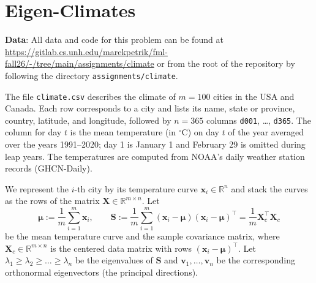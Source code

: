 \documentclass[letterpaper]{article}
\newcommand{\Real}{\mathbb{R}}
\newcommand{\tr}{^\top}
\begin{document}
\section{Eigen-Climates} \label{sec:eigen-climates}

\textbf{Data}: All data and code for this problem can be found at \url{https://gitlab.cs.unh.edu/marekpetrik/fml-fall26/-/tree/main/assignments/climate} or from the root of the repository by following the directory \texttt{assignments/climate}.

The file \texttt{climate.csv} describes the climate of $m = 100$ cities in the USA and Canada. Each row corresponds to a city and lists its name, state or province, country, latitude, and longitude, followed by $n = 365$ columns \texttt{d001}, \dots, \texttt{d365}. The column for day $t$ is the mean temperature (in $^\circ$C) on day $t$ of the year averaged over the years 1991--2020; day 1 is January 1 and February 29 is omitted during leap years. The temperatures are computed from NOAA's daily weather station records (GHCN-Daily).

We represent the $i$-th city by its temperature curve $\bm{x}_i \in \Real^n$ and stack the curves as the rows of the matrix $\bm{X} \in \Real^{m \times n}$. Let
\[
  \bm{\mu} := \frac{1}{m} \sum_{i=1}^m \bm{x}_i,
  \qquad
  \bm{S} := \frac{1}{m} \sum_{i=1}^m (\bm{x}_i - \bm{\mu})(\bm{x}_i - \bm{\mu})\tr = \frac{1}{m} \bm{X}_c\tr \bm{X}_c
\]
be the mean temperature curve and the sample covariance matrix, where $\bm{X}_c \in \Real^{m\times n}$ is the centered data matrix with rows $(\bm{x}_i - \bm{\mu})\tr$. Let $\lambda_1 \ge \lambda_2 \ge \dots \ge \lambda_n$ be the eigenvalues of $\bm{S}$ and $\bm{v}_1, \dots, \bm{v}_n$ be the corresponding orthonormal eigenvectors (the principal directions).
\end{document}
